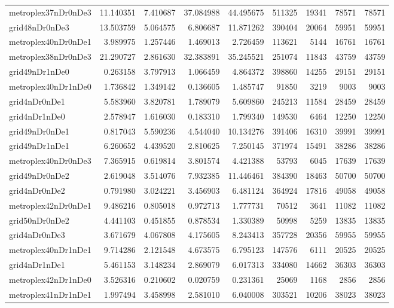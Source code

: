 \begin{longtable}{|l|r|r|r|r|r|r|r|r|}
metroplex37nDr0nDe3 & 11.140351 & 7.410687 & 37.084988 & 44.495675 & 511325 & 19341 & 78571 & 78571 \\
grid48nDr0nDe3 & 13.503759 & 5.064575 & 6.806687 & 11.871262 & 390404 & 20064 & 59951 & 59951 \\
metroplex40nDr0nDe1 & 3.989975 & 1.257446 & 1.469013 & 2.726459 & 113621 & 5144 & 16761 & 16761 \\
metroplex38nDr0nDe3 & 21.290727 & 2.861630 & 32.383891 & 35.245521 & 251074 & 11843 & 43759 & 43759 \\
grid49nDr1nDe0 & 0.263158 & 3.797913 & 1.066459 & 4.864372 & 398860 & 14255 & 29151 & 29151 \\
metroplex40nDr1nDe0 & 1.736842 & 1.349142 & 0.136605 & 1.485747 & 91850 & 3219 & 9003 & 9003 \\
grid4nDr0nDe1 & 5.583960 & 3.820781 & 1.789079 & 5.609860 & 245213 & 11584 & 28459 & 28459 \\
grid4nDr1nDe0 & 2.578947 & 1.616030 & 0.183310 & 1.799340 & 149530 & 6464 & 12250 & 12250 \\
grid49nDr0nDe1 & 0.817043 & 5.590236 & 4.544040 & 10.134276 & 391406 & 16310 & 39991 & 39991 \\
grid49nDr1nDe1 & 6.260652 & 4.439520 & 2.810625 & 7.250145 & 371974 & 15491 & 38286 & 38286 \\
metroplex40nDr0nDe3 & 7.365915 & 0.619814 & 3.801574 & 4.421388 & 53793 & 6045 & 17639 & 17639 \\
grid49nDr0nDe2 & 2.619048 & 3.514076 & 7.932385 & 11.446461 & 384390 & 18463 & 50700 & 50700 \\
grid4nDr0nDe2 & 0.791980 & 3.024221 & 3.456903 & 6.481124 & 364924 & 17816 & 49058 & 49058 \\
metroplex42nDr0nDe1 & 9.486216 & 0.805018 & 0.972713 & 1.777731 & 70512 & 3641 & 11082 & 11082 \\
grid50nDr0nDe2 & 4.441103 & 0.451855 & 0.878534 & 1.330389 & 50998 & 5259 & 13835 & 13835 \\
grid4nDr0nDe3 & 3.671679 & 4.067808 & 4.175605 & 8.243413 & 357728 & 20356 & 59955 & 59955 \\
metroplex40nDr1nDe1 & 9.714286 & 2.121548 & 4.673575 & 6.795123 & 147576 & 6111 & 20525 & 20525 \\
grid4nDr1nDe1 & 5.461153 & 3.148234 & 2.869079 & 6.017313 & 334080 & 14662 & 36303 & 36303 \\
metroplex42nDr1nDe0 & 3.526316 & 0.210602 & 0.020759 & 0.231361 & 25069 & 1168 & 2856 & 2856 \\
metroplex41nDr1nDe1 & 1.997494 & 3.458998 & 2.581010 & 6.040008 & 303521 & 10206 & 38023 & 38023 \\

\end{longtable}
